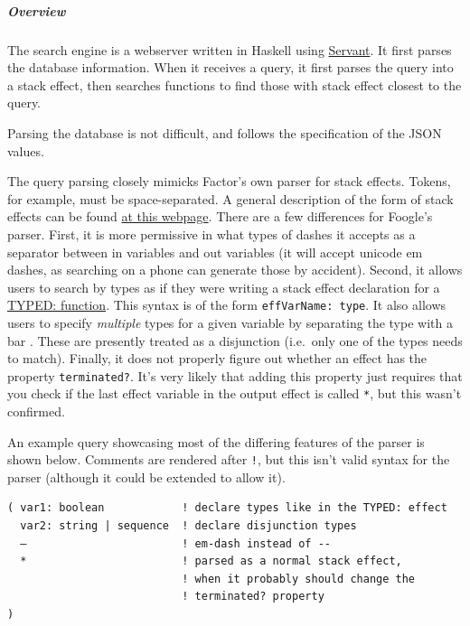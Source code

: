 \documentclass[
]{article}
\begin{document}
\hypertarget{overview}{%
\subparagraph{Overview}\label{overview}}

The search engine is a webserver written in Haskell using
\href{https://www.servant.dev/}{Servant}. It first parses the database
information. When it receives a query, it first parses the query into a
stack effect, then searches functions to find those with stack effect
closest to the query.

Parsing the database is not difficult, and follows the specification of
the JSON values.

The query parsing closely mimicks Factor's own parser for stack effects.
Tokens, for example, must be space-separated. A general description of
the form of stack effects can be found
\href{https://docs.factorcode.org/content/article-effects.html}{at this
webpage}. There are a few differences for Foogle's parser. First, it is
more permissive in what types of dashes it accepts as a separator
between in variables and out variables (it will accept unicode em
dashes, as searching on a phone can generate those by accident). Second,
it allows users to search by types as if they were writing a stack
effect declaration for a
\href{https://docs.factorcode.org/content/word-TYPED__colon__,typed.html}{TYPED:
function}. This syntax is of the form \texttt{effVarName:\ type}. It
also allows users to specify \emph{multiple} types for a given variable
by separating the type with a bar \texttt{\textbar{}}. These are
presently treated as a disjunction (i.e.~only one of the types needs to
match). Finally, it does not properly figure out whether an effect has
the property \texttt{terminated?}. It's very likely that adding this
property just requires that you check if the last effect variable in the
output effect is called \texttt{*}, but this wasn't confirmed.

An example query showcasing most of the differing features of the parser
is shown below. Comments are rendered after \texttt{!}, but this isn't
valid syntax for the parser (although it could be extended to allow it).

\begin{verbatim}
( var1: boolean            ! declare types like in the TYPED: effect
  var2: string | sequence  ! declare disjunction types
  —                        ! em-dash instead of --
  *                        ! parsed as a normal stack effect, 
                           ! when it probably should change the 
                           ! terminated? property
)
\end{verbatim}
\end{document}
